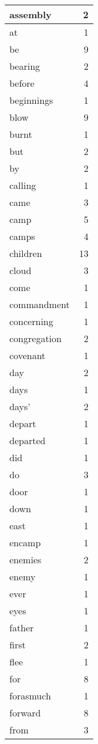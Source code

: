\begin{center}
\begin{longtable}{l|r}
assembly & 2 \\ \hline
at & 1 \\ \hline
be & 9 \\ \hline
bearing & 2 \\ \hline
before & 4 \\ \hline
beginnings & 1 \\ \hline
blow & 9 \\ \hline
burnt & 1 \\ \hline
but & 2 \\ \hline
by & 2 \\ \hline
calling & 1 \\ \hline
came & 3 \\ \hline
camp & 5 \\ \hline
camps & 4 \\ \hline
children & 13 \\ \hline
cloud & 3 \\ \hline
come & 1 \\ \hline
commandment & 1 \\ \hline
concerning & 1 \\ \hline
congregation & 2 \\ \hline
covenant & 1 \\ \hline
day & 2 \\ \hline
days & 1 \\ \hline
days' & 2 \\ \hline
depart & 1 \\ \hline
departed & 1 \\ \hline
did & 1 \\ \hline
do & 3 \\ \hline
door & 1 \\ \hline
down & 1 \\ \hline
east & 1 \\ \hline
encamp & 1 \\ \hline
enemies & 2 \\ \hline
enemy & 1 \\ \hline
ever & 1 \\ \hline
eyes & 1 \\ \hline
father & 1 \\ \hline
first & 2 \\ \hline
flee & 1 \\ \hline
for & 8 \\ \hline
forasmuch & 1 \\ \hline
forward & 8 \\ \hline
from & 3 \\ \hline

\end{longtable}
\end{center}
